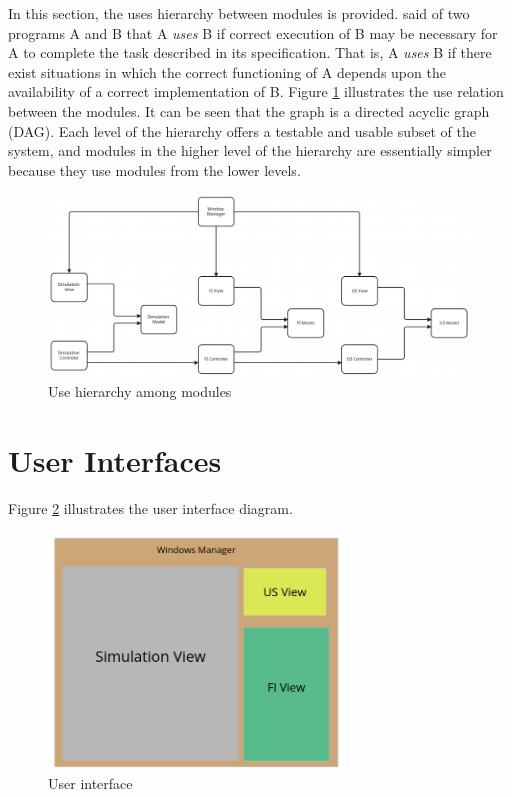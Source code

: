 \documentclass[12pt, titlepage]{article}
\begin{document}
In this section, the uses hierarchy between modules is
provided. \citet{Parnas1978} said of two programs A and B that A {\em uses} B if
correct execution of B may be necessary for A to complete the task described in
its specification. That is, A {\em uses} B if there exist situations in which
the correct functioning of A depends upon the availability of a correct
implementation of B.  Figure \ref{FigUH} illustrates the use relation between
the modules. It can be seen that the graph is a directed acyclic graph
(DAG). Each level of the hierarchy offers a testable and usable subset of the
system, and modules in the higher level of the hierarchy are essentially simpler
because they use modules from the lower levels.
\begin{figure}[H]
\centering
\includegraphics[width=1\textwidth]{UsesHierarchy.png}
\caption{Use hierarchy among modules}
\label{FigUH}
\end{figure}

\section{User Interfaces}

Figure \ref{FigUI} illustrates the user interface diagram.

\begin{figure}[H]
  \centering
  \includegraphics[width=0.7\textwidth]{UI.png}
  \caption{User interface}
  \label{FigUI}
  \end{figure}
\end{document}
